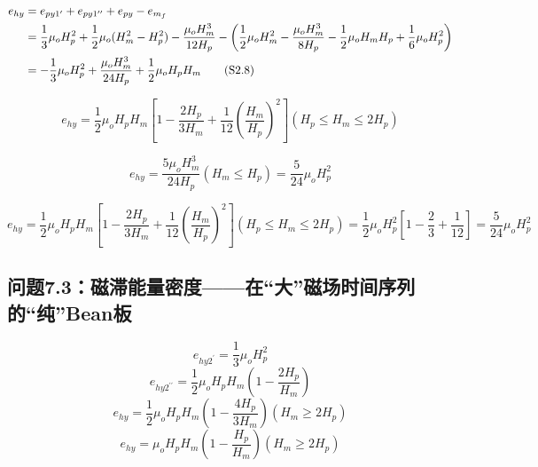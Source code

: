 \begin{align*}%
e_{hy}&=e_{py1^\prime}+e_{py1^{\prime\prime}}+e_{py}-e_{m_f} \\\notag
&=\frac{1}{3}\mu_oH_{p}^{2}+\frac{1}{2}\mu_o(H_{m}^{2}-H_{p}^{2})-\frac{\mu_oH_{m}^{3}}{12H_p} 
-\left(\frac{1}{2}\mu_oH_{m}^{2}-\frac{\mu_oH_{m}^{3}}{8H_p}-\frac{1}{2}\mu_oH_mH_p+\frac{1}{6}\mu_oH_{p}^{2}\right) \\\notag
&=-\frac{1}{3}\mu_oH_{p}^{2}+\frac{\mu_oH_{m}^{3}}{24H_p}+\frac{1}{2}\mu_oH_pH_m \tag{S2.8}
\end{align*}

\begin{equation}%
e_{hy}=\frac{1}{2}\mu_oH_pH_m\left[1-\frac{2H_p}{3H_m}+\frac{1}{12}\left(\frac{H_m}{H_p}\right)^2\right]     (H_p\leq H_m\leq 2H_p)
\end{equation}

\begin{equation}%
e_{hy}=\frac{5\mu_oH_{m}^{3}}{24H_p}    (H_m\leq H_p) 
=\frac{5}{24}\mu_oH_{p}^{2}
\end{equation}

\begin{equation}%
e_{hy}=\frac{1}{2}\mu_oH_pH_m\left[1-\frac{2H_p}{3H_m}+\frac{1}{12}\left(\frac{H_m}{H_p}\right)^2\right]    (H_p\leq H_m\leq 2H_p) 
=\frac{1}{2}\mu_oH_{p}^{2}\left[1-\frac{2}{3}+\frac{1}{12}\right]=\frac{5}{24}\mu_oH_{p}^{2}
\end{equation}


\subsection{问题7.3：磁滞能量密度——在“大”磁场时间序列的“纯”Bean板}

\begin{equation}%
e_{hy2^\prime}=\frac{1}{3}\mu_oH_{p}^{2}
\end{equation}
\begin{equation}%
e_{hy2^{\prime\prime}}=\frac{1}{2}\mu_oH_pH_m\left(1-\frac{2H_p}{H_m}\right)
\end{equation}
\begin{equation}%
e_{hy}=\frac{1}{2}\mu_oH_pH_m\left(1-\frac{4H_p}{3H_m}\right)     (H_m\geq 2H_p)
\end{equation}
\begin{equation}%
e_{hy}=\mu_oH_pH_m\left(1-\frac{H_p}{H_m}\right)      (H_m\geq 2H_p)
\end{equation}

